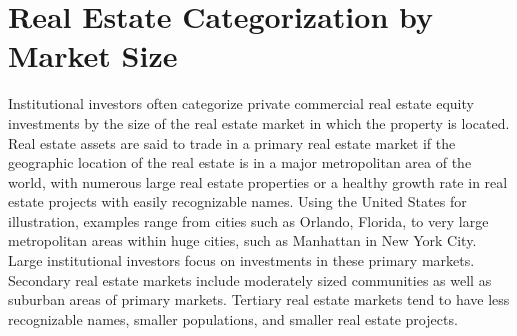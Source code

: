 \documentclass[11pt]{article}
\begin{document}
\section*{Real Estate Categorization by Market Size}
Institutional investors often categorize private commercial real estate equity investments by the size of the real estate market in which the property is located. Real estate assets are said to trade in a primary real estate market if the geographic location of the real estate is in a major metropolitan area of the world, with numerous large real estate properties or a healthy growth rate in real estate projects with easily recognizable names. Using the United States for illustration, examples range from cities such as Orlando, Florida, to very large metropolitan areas within huge cities, such as Manhattan in New York City. Large institutional investors focus on investments in these primary markets. Secondary real estate markets include moderately sized communities as well as suburban areas of primary markets. Tertiary real estate markets tend to have less recognizable names, smaller populations, and smaller real estate projects.
\end{document}
